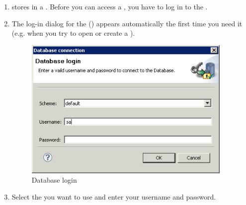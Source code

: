 \begin{enumerate}
\item \jb{} stores \gdprojects{} in a \gddb{}. Before you can access a \gdproject{}, you have to log in to the \gddb{}. 
\item The log-in dialog for the \gddb{} () appears automatically the first time you need it (e.g. when you try to open or create a \gdproject{}). 

\begin{figure}[h]
\begin{center}
\includegraphics[width=10cm]{Tasks/Database/PS/dblogin}
\caption{Database login}
\label{dblogin}
\end{center}
\end{figure}


\item Select the \gddb{} you want to use and enter your username and password.

\end{enumerate}

